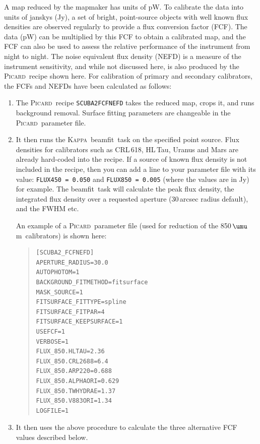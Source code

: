 \documentclass[twoside,11pt]{article}
\newcommand{\micron}{\mbox{\,${\umu}$m}}            %
\newcommand{\xref}[3]{#1}
\renewcommand{\_}{\texttt{\symbol{95}}}
\newenvironment{myquote}{\begin{quote}\begin{small}}{\end{small}\end{quote}}
\newcommand{\Kappa}{\xref{\textsc{Kappa}}{sun95}{}}
\newcommand{\picard}{\xref{\textsc{Picard}}{sun231}{}}
\newcommand{\drrecipe}[1]{\texttt{#1}}
\newcommand{\task}[1]{\textsf{#1}}
\newcommand{\beamfit}{\xref{\task{beamfit}}{sun95}{BEAMFIT}}
\begin{document}
A map reduced by the mapmaker has units of pW. To calibrate the data
into units of janskys (Jy), a set of bright, point-source objects with
well known flux densities are observed regularly to provide a flux
conversion factor (FCF). The data (pW) can be multiplied by this FCF
to obtain a calibrated map, and the FCF can also be used to assess the
relative performance of the instrument from night to night. The noise
equivalent flux density (NEFD) is a measure of the instrument
sensitivity, and while not discussed here, is also produced by the
\picard\ recipe shown here. For calibration of primary and secondary
calibrators, the FCFs and NEFDs have been calculated as follows:
\begin{enumerate}
\item{The \picard\ recipe \drrecipe{SCUBA2\_FCFNEFD} takes the reduced
  map, crops it, and runs background removal. Surface fitting
  parameters are changeable in the \picard\ parameter file.}
\item{It then runs the \Kappa\ \beamfit\ task on the specified point
  source. Flux densities for calibrators such as CRL\,618, HL\,Tau, Uranus
  and Mars are already hard-coded into the recipe. If a source of
  known flux density is not included in the recipe, then you can add a
  line to your parameter file with its value: \texttt{FLUX\_450 =
    0.050} and \texttt{FLUX\_850 = 0.005} (where the values are in Jy)
  for example. The \beamfit\ task will calculate the peak flux
  density, the integrated flux density over a requested aperture
  (30\,arcsec radius default), and the FWHM etc.}

  An example of a \picard\ parameter file (used for reduction of the
  850\micron\ calibrators) is shown here:

\begin{myquote}
\begin{verbatim}
[SCUBA2_FCFNEFD]
APERTURE_RADIUS=30.0
AUTOPHOTOM=1
BACKGROUND_FITMETHOD=fitsurface
MASK_SOURCE=1
FITSURFACE_FITTYPE=spline
FITSURFACE_FITPAR=4
FITSURFACE_KEEPSURFACE=1
USEFCF=1
VERBOSE=1
FLUX_850.HLTAU=2.36
FLUX_850.CRL2688=6.4
FLUX_850.ARP220=0.688
FLUX_850.ALPHAORI=0.629
FLUX_850.TWHYDRAE=1.37
FLUX_850.V883ORI=1.34
LOGFILE=1
\end{verbatim}
\end{myquote}

\item {It then uses the above procedure to calculate the three
  alternative FCF values described below.}
\end{enumerate}
\end{document}
